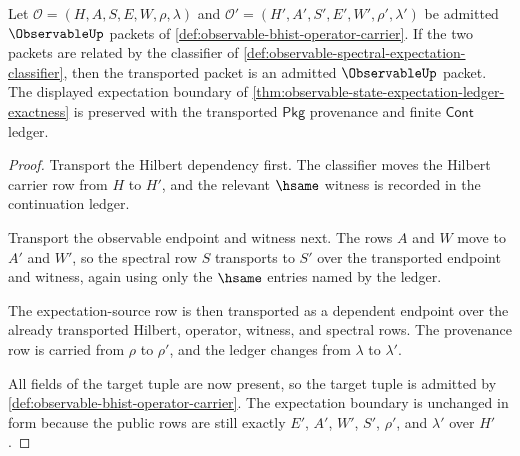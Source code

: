 \begin{theorem}
\label{thm:observable-spectral-transport-stability}
Let $\mathcal{O}=(H,A,S,E,W,\rho,\lambda)$ and
$\mathcal{O}'=(H',A',S',E',W',\rho',\lambda')$ be admitted
$\ObservableUp$ packets of \autoref{def:observable-bhist-operator-carrier}.
If the two packets are related by the classifier of
\autoref{def:observable-spectral-expectation-classifier}, then the
transported packet is an admitted $\ObservableUp$ packet. The displayed
expectation boundary of
\autoref{thm:observable-state-expectation-ledger-exactness} is preserved with
the transported $\mathsf{Pkg}$ provenance and finite $\mathsf{Cont}$ ledger.
\end{theorem}
\begin{proof}
Transport the Hilbert dependency first. The classifier moves the Hilbert
carrier row from $H$ to $H'$, and the relevant $\hsame$ witness is recorded in
the continuation ledger.

Transport the observable endpoint and witness next. The rows $A$ and $W$ move
to $A'$ and $W'$, so the spectral row $S$ transports to $S'$ over the
transported endpoint and witness, again using only the $\hsame$ entries named
by the ledger.

The expectation-source row is then transported as a dependent endpoint over
the already transported Hilbert, operator, witness, and spectral rows. The
provenance row is carried from $\rho$ to $\rho'$, and the ledger changes from
$\lambda$ to $\lambda'$.

All fields of the target tuple are now present, so the target tuple is
admitted by \autoref{def:observable-bhist-operator-carrier}. The expectation
boundary is unchanged in form because the public rows are still exactly
$E'$, $A'$, $W'$, $S'$, $\rho'$, and $\lambda'$ over $H'$.
\end{proof}

